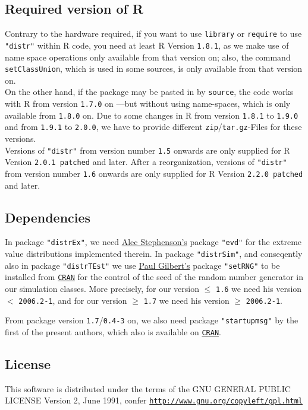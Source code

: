 \documentclass[11pt]{article}
\newcommand{\code}[1]{{\tt #1}}
\newcommand{\pkg}[1]{{\tt "#1"}}
\begin{document}
\subsection{Required version of {\sf R}}
Contrary to the hardware required,
if you want to use \code{library} or \code{require} to use  \pkg{distr} 
within {\sf R} code, you need at least {\sf R} Version {\tt 1.8.1},
as we make use of name space operations only available from that version on;
also, the command \code{setClassUnion}, which is used in some sources, is only
 available from that version on.\\
%
On the other hand, if the package may be pasted in by \code{source}, the code 
works with {\sf R} from
version {\tt 1.7.0} on ---but without using name-spaces, which is only available
 from {\tt 1.8.0} on.
Due to some changes in {\sf R} from version {\tt 1.8.1} to {\tt 1.9.0} and from 
{\tt 1.9.1} to {\tt 2.0.0}, we have to provide different
 {\tt zip}/{\tt tar.gz}-Files for these versions.\\
Versions of \pkg{distr} from version number {\tt 1.5} onwards are only
supplied for {\sf R} Version {\tt 2.0.1 patched} and later.
After a reorganization, versions of \pkg{distr} from version number {\tt 1.6} 
onwards are only supplied for {\sf R} Version {\tt 2.2.0 patched} and later.


\subsection{Dependencies}
In package \pkg{distrEx}, we need 
\href{mailto:alec_stephenson@hotmail.com}{Alec Stephenson's} package \pkg{evd} 
for the extreme  value distributions implemented therein. 
In package \pkg{distrSim}, and conseqently also in package \pkg{distrTEst} we 
use \href{mailto:pgilbert@bank-banque-canada.ca}{Paul Gilbert's}  
package \pkg{setRNG}
to be installed from \href{http://cran.r-project.org/mirrors.html}{\tt CRAN}
for the control of the seed of the random number generator in our simulation 
classes.
More precisely, for our version $\le$ {\tt 1.6}  we need his
 version $<$ {\tt 2006.2-1},
and for our version $\ge$ {\tt 1.7} we need his version $\ge$ {\tt 2006.2-1}.

From package version {\tt 1.7}/{\tt 0.4-3} on, we also need package
 \pkg{startupmsg} by the first of the present authors, which also is available 
 on \href{http://cran.r-project.org/mirrors.html}{\tt CRAN}.

\subsection{License}
This software is distributed under the terms of the GNU GENERAL
PUBLIC LICENSE Version 2, June 1991, confer\newline
\href{http://www.gnu.org/copyleft/gpl.html}%
{\footnotesize \tt http://www.gnu.org/copyleft/gpl.html}
\end{document}
